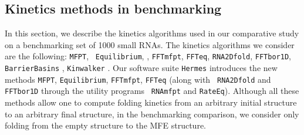 \subsection*{Kinetics methods in benchmarking}

In this section, we describe the kinetics algorithms used in our
comparative study on a benchmarking set of 1000 small RNAs. The
kinetics algorithms we consider are the following: {\tt MFPT}, {\tt
Equilibrium}, \kinfold \cite{flamm}, {\tt FFTmfpt}, {\tt FFTeq},
{\tt RNA2Dfold}, {\tt FFTbor1D}, {\tt BarrierBasins}
\cite{wolfingerStadler:kinetics}, {\tt Kinwalker} \cite{Geis.jmb08}.
Our software suite {\tt Hermes} introduces the new methods {\tt MFPT},
{\tt Equilibrium}, {\tt FFTmfpt}, {\tt FFTeq} (along with {\tt
RNA2Dfold} and {\tt FFTbor1D} through the utility programs {\tt
RNAmfpt} and {\tt RateEq}). Although all these methods allow one to
compute folding kinetics from an arbitrary initial structure to an
arbitrary final structure, in the benchmarking comparison, we consider
only folding from the empty structure to the MFE structure.
